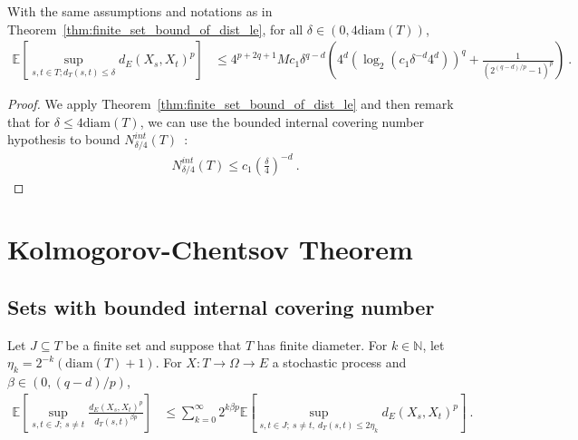 \begin{corollary}\label{cor:finite_set_bound_of_dist_le_of_le_diam}
  \leanok
With the same assumptions and notations as in Theorem~\ref{thm:finite_set_bound_of_dist_le}, for all $\delta \in (0, 4\mathrm{diam}(T))$,
\begin{align*}
  \mathbb{E}\left[ \sup_{s, t \in T; d_T(s, t) \le \delta} d_E(X_s, X_t)^p \right]
  &\le 4^{p+2q+1} M c_1 \delta^{q-d} \left(4^d \left(\log_2 \left(c_1 \delta^{-d} 4^d \right) \right)^q
    + \frac{1}{\left( 2^{(q -d)/p} - 1\right)^p}\right)
  \: .
\end{align*}
\end{corollary}

\begin{proof}
We apply Theorem~\ref{thm:finite_set_bound_of_dist_le} and then remark that for $\delta \le 4\mathrm{diam}(T)$, we can use the bounded internal covering number hypothesis to bound $N^{int}_{\delta/4}(T)$~:
\begin{align*}
  N^{int}_{\delta/4}(T) \le c_1 \left(\frac{\delta}{4}\right)^{-d} \: .
\end{align*}
\end{proof}





\section{Kolmogorov-Chentsov Theorem}


\subsection{Sets with bounded internal covering number}

\begin{lemma}\label{lem:integral_div_dist_le_sum_integral_dist_le}
  \leanok
Let $J \subseteq T$ be a finite set and suppose that $T$ has finite diameter.
For $k \in \mathbb{N}$, let $\eta_k = 2^{-k}(\mathrm{diam}(T) + 1)$.
For $X : T \to \Omega \to E$ a stochastic process and $\beta \in(0, (q - d)/p)$,
\begin{align*}
  \mathbb{E}\left[ \sup_{s, t \in J;\: s \ne t} \frac{d_E(X_s, X_t)^p}{d_T(s, t)^{\beta p}} \right]
  &\le \sum_{k=0}^\infty 2^{k \beta p} \mathbb{E}\left[ \sup_{s, t \in J;\: s \ne t, \: d_T(s, t) \le 2 \eta_k} d_E(X_s, X_t)^p \right]
  \: .
\end{align*}
\end{lemma}


